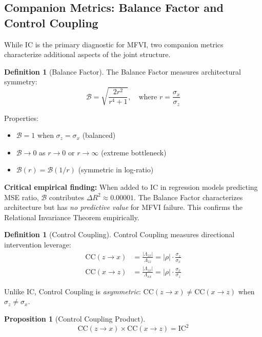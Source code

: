 \documentclass[10pt]{article} %
\theoremstyle{plain}
\newtheorem{proposition}[theorem]{Proposition}
\theoremstyle{definition}
\newtheorem{definition}[theorem]{Definition}
\newcommand{\IC}{\mathrm{IC}}  %
\newcommand{\BB}{\mathcal{B}}  %
\newcommand{\CC}{\mathrm{CC}}  %
\begin{document}
\subsection{Companion Metrics: Balance Factor and Control Coupling}
\label{sec:companion}

While IC is the primary diagnostic for MFVI, two companion metrics characterize additional aspects of the joint structure.

\begin{definition}[Balance Factor]
The Balance Factor measures architectural symmetry:
\begin{equation}
\BB = \sqrt{\frac{2r^2}{r^4 + 1}}, \quad \text{where } r = \frac{\sigma_x}{\sigma_z}
\end{equation}
\end{definition}

Properties:
\begin{itemize}
    \item $\BB = 1$ when $\sigma_z = \sigma_x$ (balanced)
    \item $\BB \to 0$ as $r \to 0$ or $r \to \infty$ (extreme bottleneck)
    \item $\BB(r) = \BB(1/r)$ (symmetric in log-ratio)
\end{itemize}

\textbf{Critical empirical finding:} When added to IC in regression models predicting MSE ratio, $\BB$ contributes $\Delta R^2 \approx 0.00001$. The Balance Factor characterizes architecture but has \emph{no predictive value} for MFVI failure. This confirms the Relational Invariance Theorem empirically.

\begin{definition}[Control Coupling]
Control Coupling measures directional intervention leverage:
\begin{align}
\CC(z \to x) &= \frac{|\Lambda_{zx}|}{\Lambda_{zz}} = |\rho| \cdot \frac{\sigma_z}{\sigma_x} \\
\CC(x \to z) &= \frac{|\Lambda_{zx}|}{\Lambda_{xx}} = |\rho| \cdot \frac{\sigma_x}{\sigma_z}
\end{align}
\end{definition}

Unlike IC, Control Coupling is \emph{asymmetric}: $\CC(z \to x) \neq \CC(x \to z)$ when $\sigma_z \neq \sigma_x$.

\begin{proposition}[Control Coupling Product]
\begin{equation}
\CC(z \to x) \times \CC(x \to z) = \IC^2
\end{equation}
\end{proposition}
\end{document}
